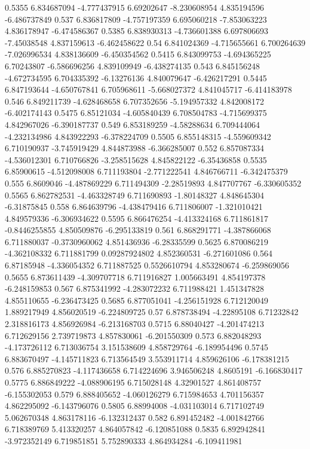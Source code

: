 {0.5355 6.834687094 -4.777437915 6.69202647 -8.230608954 4.835194596 -6.486737849
0.537 6.836817809 -4.757197359 6.695060218 -7.853063223 4.836178947 -6.474586367
0.5385 6.838930313 -4.736601388 6.697806693 -7.45038548 4.837159613 -6.462458622
0.54 6.841024369 -4.715655661 6.700264639 -7.026996534 4.838136609 -6.450354562
0.5415 6.843099753 -4.694365225 6.70243807 -6.586696256 4.839109949 -6.438274135
0.543 6.845156248 -4.672734595 6.704335392 -6.13276136 4.840079647 -6.426217291
0.5445 6.847193644 -4.650767841 6.705968611 -5.668027372 4.841045717 -6.414183978
0.546 6.849211739 -4.628468658 6.707352656 -5.194957332 4.842008172 -6.402174143
0.5475 6.85121034 -4.605840439 6.708504783 -4.715699375 4.842967026 -6.390187737
0.549 6.853189259 -4.58288634 6.709444064 -4.232134986 4.843922293 -6.378224709
0.5505 6.855148315 -4.559609342 6.710190937 -3.745919429 4.844873988 -6.366285007
0.552 6.857087334 -4.536012301 6.710766826 -3.258515628 4.845822122 -6.35436858
0.5535 6.85900615 -4.512098008 6.711193804 -2.771222541 4.846766711 -6.342475379
0.555 6.8609046 -4.487869229 6.711494309 -2.28519893 4.847707767 -6.330605352
0.5565 6.862782531 -4.463328749 6.711690893 -1.80148327 4.848645304 -6.31875845
0.558 6.864639796 -4.438479416 6.711806007 -1.321010421 4.849579336 -6.306934622
0.5595 6.866476254 -4.413324168 6.711861817 -0.8446255855 4.850509876 -6.295133819
0.561 6.868291771 -4.387866068 6.711880037 -0.3730960062 4.851436936 -6.28335599
0.5625 6.870086219 -4.362108332 6.711881799 0.09287924802 4.852360531 -6.271601086
0.564 6.87185948 -4.336054352 6.711887525 0.5526610794 4.853280674 -6.259869056
0.5655 6.873611439 -4.309707718 6.711916827 1.005663491 4.854197378 -6.248159853
0.567 6.875341992 -4.283072232 6.711988421 1.451347828 4.855110655 -6.236473425
0.5685 6.877051041 -4.256151928 6.712120049 1.889217949 4.856020519 -6.224809725
0.57 6.878738494 -4.22895108 6.71232842 2.318816173 4.856926984 -6.213168703
0.5715 6.88040427 -4.201474213 6.712629156 2.739719873 4.857830061 -6.201550309
0.573 6.882048293 -4.173726112 6.713036754 3.151538609 4.858729764 -6.189954496
0.5745 6.883670497 -4.145711823 6.713564549 3.553911714 4.859626106 -6.178381215
0.576 6.885270823 -4.117436658 6.714224696 3.946506248 4.8605191 -6.166830417
0.5775 6.886849222 -4.088906195 6.715028148 4.32901527 4.861408757 -6.155302053
0.579 6.888405652 -4.060126279 6.715984653 4.701156357 4.862295092 -6.143796076
0.5805 6.88994008 -4.031103014 6.717102749 5.062670348 4.863178116 -6.132312437
0.582 6.891452482 -4.001842766 6.718389769 5.413320257 4.864057842 -6.120851088
0.5835 6.892942841 -3.972352149 6.719851851 5.752890333 4.864934284 -6.109411981
}
